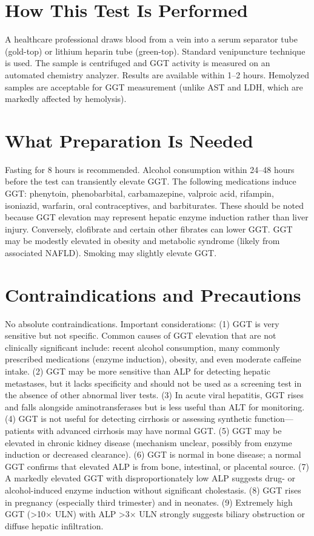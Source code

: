 \section*{How This Test Is Performed}
A healthcare professional draws blood from a vein into a serum separator tube (gold-top) or lithium heparin tube (green-top). Standard venipuncture technique is used. The sample is centrifuged and GGT activity is measured on an automated chemistry analyzer. Results are available within 1--2 hours. Hemolyzed samples are acceptable for GGT measurement (unlike AST and LDH, which are markedly affected by hemolysis).

\section*{What Preparation Is Needed}
Fasting for 8 hours is recommended. Alcohol consumption within 24--48 hours before the test can transiently elevate GGT. The following medications induce GGT: phenytoin, phenobarbital, carbamazepine, valproic acid, rifampin, isoniazid, warfarin, oral contraceptives, and barbiturates. These should be noted because GGT elevation may represent hepatic enzyme induction rather than liver injury. Conversely, clofibrate and certain other fibrates can lower GGT. GGT may be modestly elevated in obesity and metabolic syndrome (likely from associated NAFLD). Smoking may slightly elevate GGT.

\section*{Contraindications and Precautions}
No absolute contraindications. Important considerations: (1) GGT is very sensitive but not specific. Common causes of GGT elevation that are not clinically significant include: recent alcohol consumption, many commonly prescribed medications (enzyme induction), obesity, and even moderate caffeine intake. (2) GGT may be more sensitive than ALP for detecting hepatic metastases, but it lacks specificity and should not be used as a screening test in the absence of other abnormal liver tests. (3) In acute viral hepatitis, GGT rises and falls alongside aminotransferases but is less useful than ALT for monitoring. (4) GGT is not useful for detecting cirrhosis or assessing synthetic function---patients with advanced cirrhosis may have normal GGT. (5) GGT may be elevated in chronic kidney disease (mechanism unclear, possibly from enzyme induction or decreased clearance). (6) GGT is normal in bone disease; a normal GGT confirms that elevated ALP is from bone, intestinal, or placental source. (7) A markedly elevated GGT with disproportionately low ALP suggests drug- or alcohol-induced enzyme induction without significant cholestasis. (8) GGT rises in pregnancy (especially third trimester) and in neonates. (9) Extremely high GGT (>10$\times$ ULN) with ALP >3$\times$ ULN strongly suggests biliary obstruction or diffuse hepatic infiltration.

